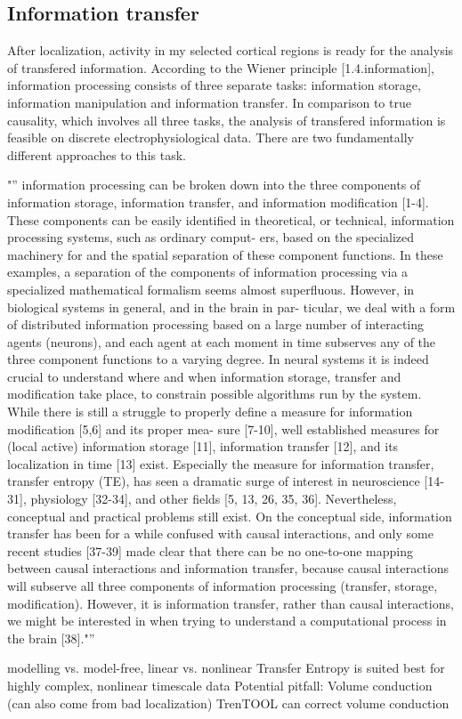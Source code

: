 \subsection{Information transfer}
After localization, activity in my selected cortical regions is ready for the analysis of transfered information.
According to the Wiener principle [1.4.information], information processing consists of three separate tasks: information storage, information manipulation and information transfer.
In comparison to true causality, which involves all three tasks, the analysis of transfered information is feasible on discrete electrophysiological data. 
There are two fundamentally different approaches to this task.


"'' information processing can be broken down into the three components of
 information storage, information transfer, and information modification [1-4]. These components can be
 easily identified in theoretical, or technical, information processing systems, such as ordinary comput-
 ers, based on the specialized machinery for and the spatial separation of these component functions. In
 these examples, a separation of the components of information processing via a specialized mathematical
 formalism seems almost superfluous. However, in biological systems in general, and in the brain in par-
 ticular, we deal with a form of distributed information processing based on a large number of interacting
 agents (neurons), and each agent at each moment in time subserves any of the three component functions
 to a varying degree. In neural systems it is indeed crucial to understand where and when information
 storage, transfer and modification take place, to constrain possible algorithms run by the system. While
 there is still a struggle to properly define a measure for information modification [5,6] and its proper mea-
 sure [7-10], well established measures for (local active) information storage [11], information transfer [12],
 and its localization in time [13] exist.
 Especially the measure for information transfer, transfer entropy (TE), has seen a dramatic surge
 of interest in neuroscience [14-31], physiology [32-34], and other fields [5, 13, 26, 35, 36]. Nevertheless,
 conceptual and practical problems still exist. On the conceptual side, information transfer has been for a
 while confused with causal interactions, and only some recent studies [37-39] made clear that there can be
 no one-to-one mapping between causal interactions and information transfer, because causal interactions
 will subserve all three components of information processing (transfer, storage, modification). However,
 it is information transfer, rather than causal interactions, we might be interested in when trying to
 understand a computational process in the brain [38]."''

modelling vs. model-free, linear vs. nonlinear
Transfer Entropy is suited best for highly complex, nonlinear timescale data
Potential pitfall: Volume conduction (can also come from bad localization)
TrenTOOL can correct volume conduction
